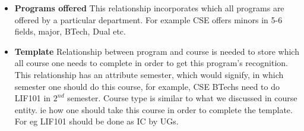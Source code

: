 \documentclass[a4paper]{article}
\begin{document}
\begin{itemize}
	\item{\textbf{Programs offered}} This relationship incorporates which all programs are offered by a
	particular department. For example CSE offers minors in 5-6 fields, major, BTech, Dual etc.
	\item{\textbf{Template}} Relationship between program and course is needed to store which all course one
	needs to complete in order to get this program's recognition. This relationship has an attribute semester,
	which would signify, in which semester one should do this course, for example, CSE BTechs need to do LIF101
	in $2^{nd}$ semester. Course type is similar to what we discussed in course entity. ie how one should take this
	course in order to complete the template. For eg LIF101 should be done as IC by UGs.
\end{itemize}
\end{document}

